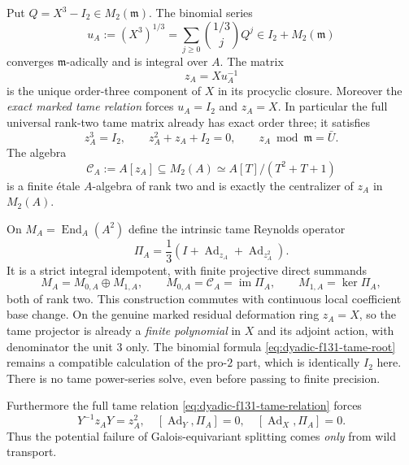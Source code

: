 \begin{theorem}
\label{thm:dyadic-f131-canonical-tame-extraction}
Put $Q=X^3-I_2\in M_2(\mathfrak m)$.
The binomial series
\begin{equation}\label{eq:dyadic-f131-tame-root}
u_A:=(X^3)^{1/3}
=\sum_{j\ge0}\binom{1/3}{j}Q^j
\in I_2+M_2(\mathfrak m)
\end{equation}
converges $\mathfrak m$-adically
and is integral over $A$.
The matrix
\begin{equation}\label{eq:dyadic-f131-odd-tame-matrix}
\boxed{\qquad
z_A=Xu_A^{-1}
\qquad}
\end{equation}
is the unique order-three
component of $X$ in its
procyclic closure.  Moreover the
\emph{exact marked tame relation}
forces $u_A=I_2$ and $z_A=X$.
In particular the full universal
rank-two tame matrix already
has exact order three; it satisfies
\begin{equation}\label{eq:dyadic-f131-cubic-etale}
\boxed{\qquad
z_A^3=I_2,\qquad
z_A^2+z_A+I_2=0,\qquad
z_A\bmod\mathfrak m=\bar U.
\qquad}
\end{equation}
The algebra
\begin{equation}\label{eq:dyadic-f131-canonical-tame-etale-algebra}
\mathcal C_A:=A[z_A]\subseteq M_2(A)
\simeq A[T]/(T^2+T+1)
\end{equation}
is a finite étale $A$-algebra
of rank two and is exactly the
centralizer of $z_A$ in $M_2(A)$.

On $M_A=\operatorname{End}_A(A^2)$
define the intrinsic tame Reynolds operator
\begin{equation}\label{eq:dyadic-f131-universal-tame-projector}
\boxed{\qquad
\Pi_A=\frac13
\left(I+\operatorname{Ad}_{z_A}
+\operatorname{Ad}_{z_A^2}\right).
\qquad}
\end{equation}
It is a strict integral idempotent,
with finite projective direct summands
\begin{equation}\label{eq:dyadic-f131-universal-tame-summands}
M_A=M_{0,A}\oplus M_{1,A},
\qquad M_{0,A}=\mathcal C_A=\operatorname{im}\Pi_A,
\qquad M_{1,A}=\ker\Pi_A,
\end{equation}
both of rank two.
This construction commutes with
continuous local coefficient base
change.  On the genuine
marked residual deformation ring
$z_A=X$, so the tame
projector is already a
\emph{finite polynomial} in
$X$ and its adjoint action,
with denominator the unit $3$
only.  The binomial formula
\eqref{eq:dyadic-f131-tame-root}
remains a compatible calculation
of the pro-$2$ part, which is
identically $I_2$ here.
There is no tame power-series
solve, even before passing
to finite precision.

Furthermore the full tame relation
\eqref{eq:dyadic-f131-tame-relation}
forces
\begin{equation}\label{eq:dyadic-f131-sigma-tame-normalization}
\boxed{\qquad
Y^{-1}z_A Y=z_A^2,
\quad
[\operatorname{Ad}_Y,\Pi_A]=0,
\quad
[\operatorname{Ad}_X,\Pi_A]=0.
\qquad}
\end{equation}
Thus the potential failure of
Galois-equivariant splitting comes
\emph{only} from wild transport.
\end{theorem}

